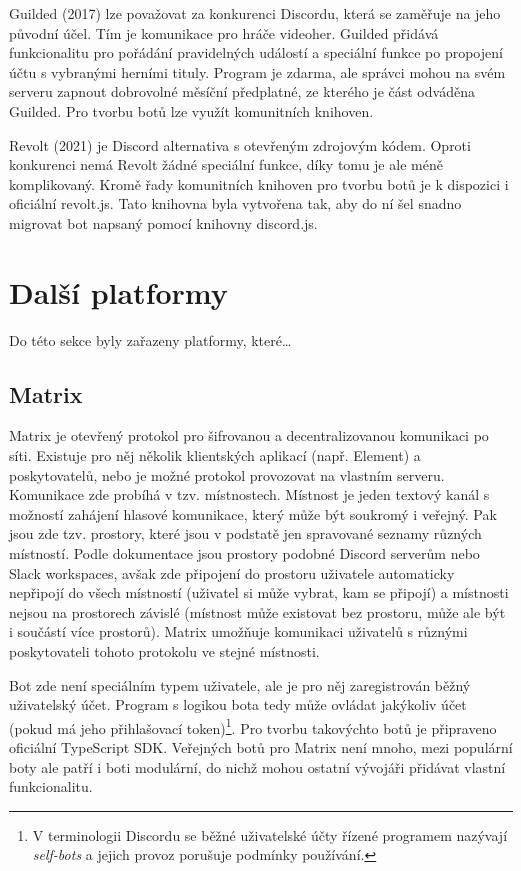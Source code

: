 \documentclass[FM]{tulthesis}
\begin{document}
	Guilded (2017) lze považovat za konkurenci Discordu, která se zaměřuje na jeho původní účel. Tím je komunikace pro hráče videoher. Guilded přidává funkcionalitu pro pořádání pravidelných událostí a speciální funkce po propojení účtu s vybranými herními tituly. Program je zdarma, ale správci mohou na svém serveru zapnout dobrovolné měsíční předplatné, ze kterého je část odváděna Guilded. Pro tvorbu botů lze využít komunitních knihoven. \cite{web_guilded}
	
	Revolt (2021) je Discord alternativa s otevřeným zdrojovým kódem. Oproti konkurenci nemá Revolt žádné speciální funkce, díky tomu je ale méně komplikovaný. Kromě řady komunitních knihoven pro tvorbu botů je k dispozici i oficiální revolt.js. Tato knihovna byla vytvořena tak, aby do ní šel snadno migrovat bot napsaný pomocí knihovny discord.js.
	\section{Další platformy}
	
	Do této sekce byly zařazeny platformy, které\dots%
	
	\subsection{Matrix}
	
	Matrix je otevřený protokol pro šifrovanou a decentralizovanou komunikaci po síti. Existuje pro něj několik klientských aplikací (např. Element) a poskytovatelů, nebo je možné protokol provozovat na vlastním serveru. Komunikace zde probíhá v tzv. místnostech. Místnost je jeden textový kanál s možností zahájení hlasové komunikace, který může být soukromý i veřejný. Pak jsou zde tzv. prostory, které jsou v podstatě jen spravované seznamy různých místností. Podle dokumentace jsou prostory podobné Discord serverům nebo Slack workspaces, avšak zde připojení do prostoru uživatele automaticky nepřipojí do všech místností (uživatel si může vybrat, kam se připojí) a místnosti nejsou na prostorech závislé (místnost může existovat bez prostoru, může ale být i součástí více prostorů). Matrix umožňuje komunikaci uživatelů s různými poskytovateli tohoto protokolu ve stejné místnosti.
	
	Bot zde není speciálním typem uživatele, ale je pro něj zaregistrován běžný uživatelský účet. Program s logikou bota tedy může ovládat jakýkoliv účet (pokud má jeho přihlašovací token)\footnote{V terminologii Discordu se běžné uživatelské účty řízené programem nazývají \textit{self-bots} a jejich provoz porušuje podmínky používání.}. Pro tvorbu takovýchto botů je připraveno oficiální \mbox{TypeScript} SDK. Veřejných botů pro Matrix není mnoho, mezi populární boty ale patří i boti modulární, do nichž mohou ostatní vývojáři přidávat vlastní funkcionalitu.
	
\end{document}
